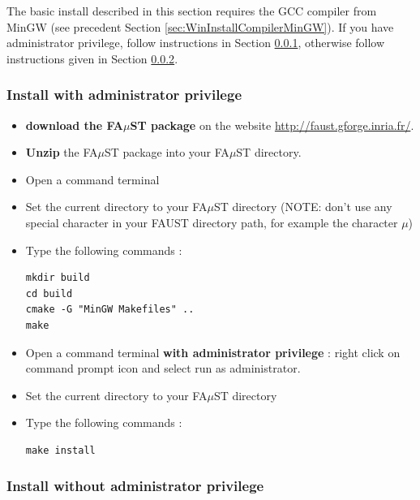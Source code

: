 The basic install described in this section requires the GCC compiler from MinGW (see precedent Section \ref{sec:WinInstallCompilerMinGW}).
If you have administrator privilege, follow instructions in Section \ref{sec:WinMinGWadminBasicInstall}, otherwise follow instructions given in Section \ref{sec:WinMinGWNoAdminBasicInstall}.
\subsubsection{Install with administrator privilege}
\label{sec:WinMinGWadminBasicInstall}
\begin{itemize}
\item \textbf{download the FA$\mu$ST package} on the website  \url{http://faust.gforge.inria.fr/}. 
\item \textbf{Unzip} the FA$\mu$ST package into your FA$\mu$ST directory. 

\item Open a command terminal
\item Set the current directory to your FA$\mu$ST directory (NOTE: don't use any special character in your FAUST directory path, for example the character $\mu$)
\item Type the following commands : 
\begin{lstlisting}
mkdir build
cd build
cmake -G "MinGW Makefiles" .. 
make
\end{lstlisting}

\item Open a command terminal \textbf{with administrator privilege} : right click on command prompt icon and select run as administrator. 
\item Set the current directory to your FA$\mu$ST directory
\item Type the following commands : 
\begin{lstlisting}
make install 
\end{lstlisting}
\end{itemize}

\subsubsection{Install without administrator privilege}
\label{sec:WinMinGWNoAdminBasicInstall}

